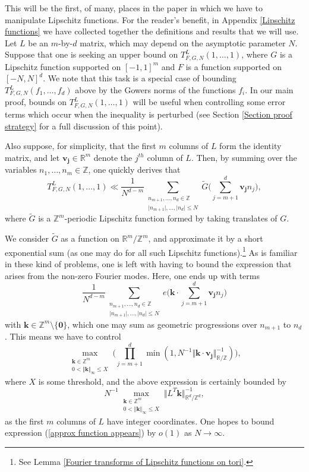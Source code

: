 \documentclass[12pt,a4paper,twoside,reqno]{amsart}
\numberwithin{equation}{section}
\begin{document}
This will be the first, of many, places in the paper in which we have to manipulate Lipschitz functions. For the reader's benefit, in Appendix \ref{Lipschitz functions} we have collected together the definitions and results that we will use. \\

Let $L$ be an $m$-by-$d$ matrix, which may depend on the asymptotic parameter $N$. Suppose that one is seeking an upper bound on $T_{F,G,N}^L(1,\dots,1)$, where $G$ is a Lipschitz function supported on $[-1,1]^m$ and $F$ is a function supported on $[-N,N]^d$. We note that this task is a special case of bounding $T_{F,G,N}^L(f_1,\dots,f_d)$ above by the Gowers norms of the functions $f_i$. In our main proof, bounds on $T_{F,G,N}^L(1,\dots,1)$ will be useful when controlling some error terms which occur when the inequality is perturbed (see Section \ref{Section proof strategy} for a full discussion of this point).

 Also suppose, for simplicity, that the first $m$ columns of $L$ form the identity matrix, and let $\mathbf{v_j} \in \mathbb{R}^m$ denote the $j^{th}$ column of $L$. Then, by summing over the variables $n_1,\dots,n_m \in \mathbb{Z}$, one quickly derives that \[ T_{F,G,N}^L(1,\dots,1) \ll \frac{1}{N^{d-m}} \sum\limits_{\substack{n_{m+1},\dots,n_d \in \mathbb{Z} \\ \vert n_{m+1}\vert, \dots, \vert n_d\vert \leqslant N}} \widetilde{G}\Big(\sum\limits_{j=m+1}^d \mathbf{v_j} n_j\Big),\] where $\widetilde{G}$ is a $\mathbb{Z}^m$-periodic Lipschitz function formed by taking translates of $G$. 

We consider $\widetilde{G}$ as a function on $\mathbb{R}^m/\mathbb{Z}^m$, and approximate it by a short exponential sum (as one may do for all such Lipschitz functions).\footnote{See Lemma \ref{Fourier transforms of Lipschitz functions on tori}.} As is familiar in these kind of problems, one is left with having to bound the expression that arises from the non-zero Fourier modes. Here, one ends up with terms\[ \frac{1}{N^{d-m}}\sum\limits_{\substack{n_{m+1},\dots,n_d \in \mathbb{Z} \\ \vert n_{m+1}\vert, \dots, \vert n_d\vert \leqslant N}} e\Big( \mathbf{k} \cdot \sum\limits_{j=m+1}^d \mathbf{v_j} n_j \Big)\] with $\mathbf{k} \in \mathbb{Z}^m \setminus \{\mathbf{0}\}$, which one may sum as geometric progressions over $n_{m+1}$ to $n_d$. This means we have to control \[ \max \limits_{\substack{ \mathbf{k} \in \mathbb{Z}^m \\ 0 < \Vert \mathbf{k} \Vert_\infty \leqslant X}} \Big(\prod\limits_{j=m+1}^d \min(1,N^{-1} \Vert \mathbf{k} \cdot \mathbf{v_j}\Vert_{\mathbb{R}/\mathbb{Z}}^{-1})\Big),\] where $X$ is some threshold, and the above expression is certainly bounded by 
\begin{equation}
\label{approx function appears}
 N^{-1}\max \limits_{ \substack{\mathbf{k} \in \mathbb{Z}^m \\ 0 < \Vert \mathbf{k}\Vert_\infty \leqslant X}} \Vert L^T \mathbf{k}\Vert_{\mathbb{R}^d/\mathbb{Z}^d}^{-1},
 \end{equation} as the first $m$ columns of $L$ have integer coordinates. One hopes to bound expression (\ref{approx function appears}) by $o(1)$ as $N\rightarrow \infty$.
\end{document}
